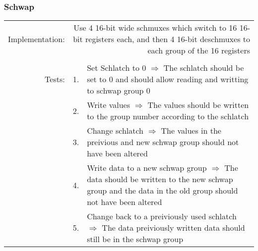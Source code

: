		\subsubsection{Schwap}
			\begin{tabular}{ r  r  p{12cm} }
				Implementation: & \multicolumn{2}{p{12.75cm}}{Use 4 16-bit wide schmuxes which switch to 16 16-bit registers each, and then 4 16-bit deschmuxes to each group of the 16 registers}\\
				                &    & \\
				         Tests: & 1. & Set Schlatch to 0 $\Rightarrow$ The schlatch should be set to 0 and should allow reading and writting to schwap group 0\\
				                & 2. & Write values $\Rightarrow$ The values should be written to the group number according to the schlatch\\
					            & 3. & Change schlatch $\Rightarrow$ The values in the preivious and new schwap group should not have been altered\\
					            & 4. & Write data to a new schwap group $\Rightarrow$ The data should be written to the new schwap group and the data in the old group should not have been altered\\
					            & 5. & Change back to a preiviously used schlatch $\Rightarrow$ The data preiviously written data should still be in the schwap group\\
			\end{tabular}
